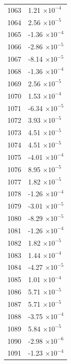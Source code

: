 \documentclass[a4paper,11pt]{article}
\begin{document}
\begin{center}
\begin{longtable}{|R{1.5cm}|R{2.5cm}|}
 1063 &         1.21 $\times 10^{          -4}$ \\
 1064 &         2.56 $\times 10^{          -5}$ \\
 1065 &        -1.36 $\times 10^{          -4}$ \\
 1066 &        -2.86 $\times 10^{          -5}$ \\
 1067 &        -8.14 $\times 10^{          -5}$ \\
 1068 &        -1.36 $\times 10^{          -4}$ \\
 1069 &         2.56 $\times 10^{          -5}$ \\
 1070 &         1.53 $\times 10^{          -4}$ \\
 1071 &        -6.34 $\times 10^{          -5}$ \\
 1072 &         3.93 $\times 10^{          -5}$ \\
 1073 &         4.51 $\times 10^{          -5}$ \\
 1074 &         4.51 $\times 10^{          -5}$ \\
 1075 &        -4.01 $\times 10^{          -4}$ \\
 1076 &         8.95 $\times 10^{          -5}$ \\
 1077 &         1.82 $\times 10^{          -5}$ \\
 1078 &        -1.26 $\times 10^{          -4}$ \\
 1079 &        -3.01 $\times 10^{          -5}$ \\
 1080 &        -8.29 $\times 10^{          -5}$ \\
 1081 &        -1.26 $\times 10^{          -4}$ \\
 1082 &         1.82 $\times 10^{          -5}$ \\
 1083 &         1.44 $\times 10^{          -4}$ \\
 1084 &        -4.27 $\times 10^{          -5}$ \\
 1085 &         1.01 $\times 10^{          -4}$ \\
 1086 &         5.71 $\times 10^{          -5}$ \\
 1087 &         5.71 $\times 10^{          -5}$ \\
 1088 &        -3.75 $\times 10^{          -4}$ \\
 1089 &         5.84 $\times 10^{          -5}$ \\
 1090 &        -2.98 $\times 10^{          -6}$ \\
 1091 &        -1.23 $\times 10^{          -4}$ \\

\end{longtable}
\end{center}
\end{document}
